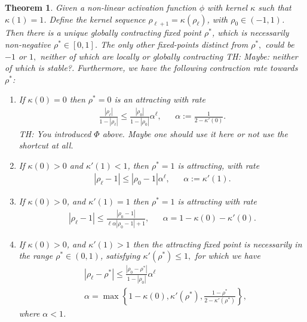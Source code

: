 \documentclass[twoside]{article}
\newtheorem{theorem}{Theorem}
\theoremstyle{definition}
\newcommand{\thomas}[1]{{\color{blue}TH:  \textit{#1}}}
\begin{document}
\begin{theorem}
\label{thm:global_attract}
Given a non-linear activation function $\phi$ with kernel  $\kappa$ such that $\kappa(1)=1$. Define the kernel sequence $\rho_{\ell+1}=\kappa(\rho_\ell)$, with  $\rho_0 \in (-1,1)$. Then there is a unique globally contracting fixed point $\rho^*$, which is necessarily non-negative $\rho^*\in[0,1]$. The only other fixed-points distinct from $\rho^*,$ could be $-1$ or $1,$ neither of which are locally or globally contracting \thomas{Maybe: neither of which is stable?}. Furthermore, we have the following contraction rate towards $\rho^*$:
\begin{enumerate}
    \item If $\kappa(0)=0$ then $\rho^*=0$ is an attracting with rate 
    \begin{align*}
    \frac{|\rho_\ell|}{1-|\rho_\ell|} \le \frac{|\rho_0|}{1-|\rho_0|} \alpha^\ell, && \alpha:=\frac{1}{2-\kappa'(0)}.
    \end{align*}
    \thomas{You introduced $\Phi$ above. Maybe one should use it here or not use the shortcut at all.}
    \item If $\kappa(0)>0$ and $\kappa'(1)<1$, then $\rho^*=1$ is attracting, with rate 
    \begin{align*}
    |\rho_\ell-1| \le |\rho_0-1| \alpha ^\ell, && \alpha := \kappa'(1).
    \end{align*}
    \item If $\kappa(0) > 0$, and $\kappa'(1)=1$ then  $\rho^*=1$ is attracting with rate 
    \begin{align*}
    |\rho_\ell-1| \le \frac{|\rho_0-1|}{\ell\alpha|\rho_0-1|+1}, && \alpha = 1-\kappa(0)-\kappa'(0).
    \end{align*}
    \item If $\kappa(0) > 0$, and $\kappa'(1)>1$ then the attracting fixed point is necessarily in the range $\rho^*\in(0,1)$, satisfying $\kappa'(\rho^*)\le 1,$ for which we have  
    \begin{align*}
    &|\rho_\ell-\rho^*| \le \frac{|\rho_0-\rho^*|}{1-|\rho_0|}\alpha^\ell \\ &\alpha = \max\left\{1-\kappa(0),\kappa'(\rho^*),\frac{1-\rho^*}{2-\kappa'(\rho^*)}\right\},
    \end{align*}
    where $\alpha<1$.
\end{enumerate}
\end{theorem}
\end{document}
